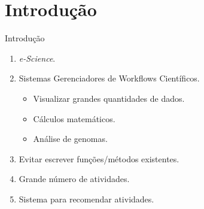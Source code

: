 \section{Introdução}

\begin{frame}		
	\begin{block}{Introdução}
		 \begin{enumerate}
		  \item \emph{e-Science}.
		  \item Sistemas Gerenciadores de Workflows Científicos.
			  \begin{itemize}
			  	\item Visualizar grandes quantidades de dados.
				\item Cálculos matemáticos.
				\item Análise de genomas.
			  \end{itemize}
		  \item Evitar escrever funções/métodos existentes.
		  \item Grande número de atividades.
		  \item Sistema para recomendar atividades.
		 \end{enumerate}
	\end{block}
\end{frame}